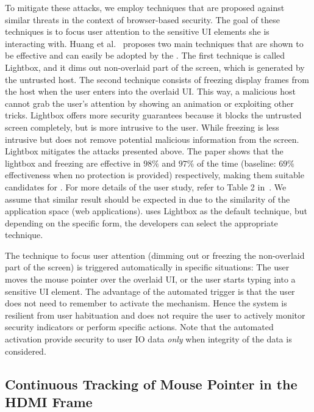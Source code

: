 To mitigate these attacks, we employ techniques that are proposed against similar threats in the context of browser-based security. The goal of these techniques is to focus user attention to the sensitive UI elements she is interacting with. Huang et al.~\cite{huang2012clickjacking} proposes two main techniques that are shown to be effective and can easily be adopted by the \device.  The first technique is called Lightbox, and it dims out non-overlaid part of the screen, which is generated by the untrusted host. The second technique consists of freezing display frames from the host when the user enters into the overlaid UI. This way, a malicious host cannot grab the user's attention by showing an animation or exploiting other tricks.
Lightbox offers more security guarantees because it blocks the untrusted screen completely, but is more intrusive to the user. While freezing is less intrusive but does not remove potential malicious information from the screen.
Lightbox mitigates the attacks presented above. The paper shows that the lightbox and freezing are effective in $98\%$ and $97\%$ of the time (baseline: $69\%$ effectiveness when no protection is provided) respectively, making them suitable candidates for \name. For more details of the user study, refer to Table 2 in~\cite{huang2012clickjacking}. We assume that similar result should be expected in \name due to the similarity of the application space (web applications). \device uses Lightbox as the default technique, but depending on the specific form, the developers can select the appropriate technique.

 The technique to focus user attention (dimming out or freezing the non-overlaid part of the screen) is triggered automatically in specific situations: The user moves the mouse pointer over the overlaid UI, or the user starts typing into a sensitive UI element. 
The advantage of the automated trigger is that the user does not need to remember to activate the mechanism. Hence the system is resilient from user habituation and does not require the user to actively monitor security indicators or perform specific actions. Note that the automated activation provide security to user IO data \emph{only} when integrity of the data is considered.

\subsection{Continuous Tracking of Mouse Pointer in the HDMI Frame}
\label{sec:systemDesign:analysis}


